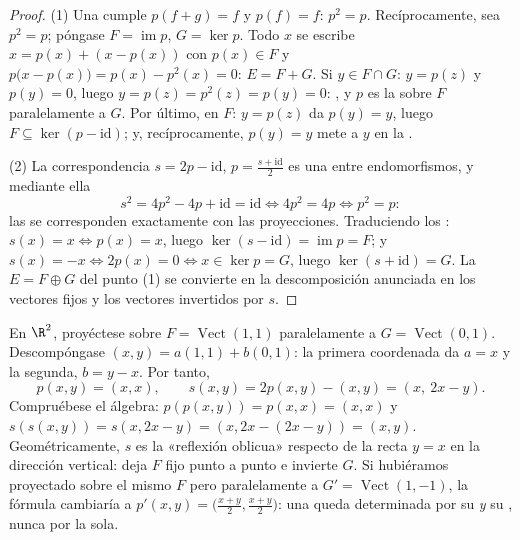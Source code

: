 \begin{proof}
(1) Una  cumple $p(f + g) = f$ y $p(f) = f$: $p^2 = p$.
Recíprocamente, sea $p^2 = p$; póngase $F = \operatorname{im} p$,
$G = \ker p$. Todo $x$ se escribe $x = p(x) + (x - p(x))$ con
$p(x) \in F$ y $p\bigl(x - p(x)\bigr) = p(x) - p^2(x) = 0$:
$E = F + G$. Si $y \in F \cap G$: $y = p(z)$ y $p(y) = 0$, luego
$y = p(z) = p^2(z) = p(y) = 0$: , y $p$ es la
 sobre $F$ paralelamente a $G$. Por último, en $F$:
$y = p(z)$ da $p(y) = y$, luego $F \subseteq \ker(p - \mathrm{id})$;
y, recíprocamente, $p(y) = y$ mete a $y$ en la .

(2) La correspondencia $s = 2p - \mathrm{id}$,
$p = \frac{s + \mathrm{id}}2$ es una  entre endomorfismos, y
mediante ella
\[
s^2 = 4p^2 - 4p + \mathrm{id} = \mathrm{id}
\iff 4p^2 = 4p \iff p^2 = p :
\]
las  se corresponden exactamente con las proyecciones.
Traduciendo los : $s(x) = x \iff p(x) = x$, luego
$\ker(s - \mathrm{id}) = \operatorname{im} p = F$; y
$s(x) = -x \iff 2p(x) = 0 \iff x \in \ker p = G$, luego
$\ker(s + \mathrm{id}) = G$. La  $E = F \oplus G$ del
punto (1) se convierte en la descomposición anunciada en los vectores
fijos y los vectores invertidos por $s$.
\end{proof}

\begin{example}
\label{ex:b1:linmaps:projexplicit}
En $\R^2$, proyéctese sobre $F = \operatorname{Vect}(1,1)$
paralelamente a $G = \operatorname{Vect}(0,1)$. Descompóngase
$(x, y) = a(1,1) + b(0,1)$: la primera coordenada da $a = x$ y la
segunda, $b = y - x$. Por tanto,
\[
p(x, y) = (x, x),
\qquad
s(x, y) = 2p(x,y) - (x,y) = (x,\ 2x - y).
\]
Compruébese el álgebra: $p(p(x,y)) = p(x,x) = (x,x)$ y
$s(s(x,y)) = s(x, 2x - y) = (x, 2x - (2x - y)) = (x, y)$.
Geométricamente, $s$ es la «reflexión oblicua» respecto de la recta
$y = x$ en la dirección vertical: deja $F$ fijo punto a punto e
invierte $G$. Si hubiéramos proyectado sobre el mismo $F$ pero
paralelamente a $G' = \operatorname{Vect}(1,-1)$, la fórmula
cambiaría a $p'(x,y) = \bigl(\frac{x+y}2, \frac{x+y}2\bigr)$: una
 queda determinada por su  \emph{y} su ,
nunca por la  sola.
\end{example}

